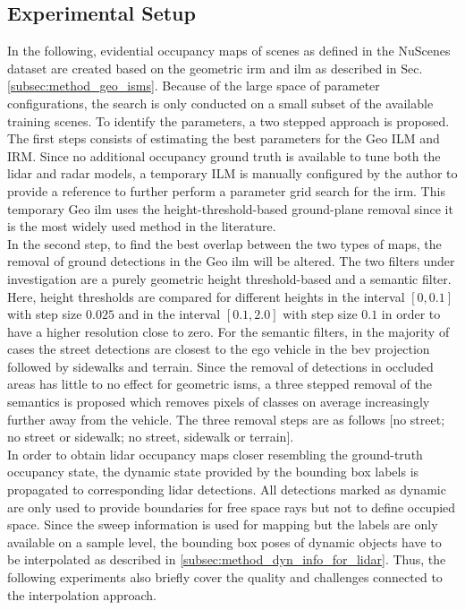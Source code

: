 \subsection{Experimental Setup}
\label{subsec:exp_setup_gt}
In the following, evidential occupancy maps of scenes as defined in the NuScenes dataset are created based on the geometric \gls{irm} and \gls{ilm} as described in Sec. \ref{subsec:method_geo_isms}. Because of the large space of parameter configurations, the search is only conducted on a small subset of the available training scenes. To identify the parameters, a two stepped approach is proposed.
\\
The first steps consists of estimating the best parameters for the Geo ILM and IRM. Since no additional occupancy ground truth is available to tune both the lidar and radar models, a temporary ILM is manually configured by the author to provide a reference to further perform a parameter grid search for the \gls{irm}. This temporary Geo \gls{ilm} uses the height-threshold-based ground-plane removal since it is the most widely used method in the literature.
\\
In the second step, to find the best overlap between the two types of maps, the removal of ground detections in the Geo \gls{ilm} will be altered. The two filters under investigation are a purely geometric height threshold-based and a semantic filter. Here, height thresholds are compared for different heights in the interval $[0,0.1]$ with step size $0.025$ and in the interval $[0.1,2.0]$ with step size $0.1$ in order to have a higher resolution close to zero. For the semantic filters, in the majority of cases the street detections are closest to the ego vehicle in the \gls{bev} projection followed by sidewalks and terrain. Since the removal of detections in occluded areas has little to no effect for geometric \gls{ism}s, a three stepped removal of the semantics is proposed which removes pixels of classes on average increasingly further away from the vehicle. The three removal steps are as follows $[$no street; no street or sidewalk; no street, sidewalk or terrain$]$.
\\
In order to obtain lidar occupancy maps closer resembling the ground-truth occupancy state, the dynamic state provided by the bounding box labels is propagated to corresponding lidar detections. All detections marked as dynamic are only used to provide boundaries for free space rays but not to define occupied space. Since the sweep information is used for mapping but the labels are only available on a sample level, the bounding box poses of dynamic objects have to be interpolated as described in \ref{subsec:method_dyn_info_for_lidar}. Thus, the following experiments also briefly cover the quality and challenges connected to the interpolation approach.
%
